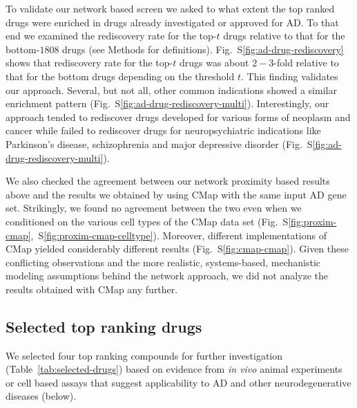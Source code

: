 \documentclass[letterpaper]{article}
\begin{document}
To validate our network based screen we asked to what extent the top ranked
drugs were enriched in drugs already investigated or approved for AD.  To that
end we examined the rediscovery rate for the top-$t$ drugs relative to that
for the bottom-$1808$ drugs (see Methods for definitions).
Fig.~S\ref{fig:ad-drug-rediscovery} shows that rediscovery rate for the
top-$t$ drugs was about $2-3$-fold relative to that for the bottom drugs
depending on the threshold $t$.  This finding validates our approach.
Several, but not all, other common indications showed a similar enrichment
pattern (Fig.~S\ref{fig:ad-drug-rediscovery-multi}).  Interestingly, our
approach tended to rediscover drugs developed for various forms of neoplasm
and cancer while failed to rediscover drugs for neuropsychiatric indications
like Parkinson's disease, schizophrenia and major depressive disorder
(Fig.~S\ref{fig:ad-drug-rediscovery-multi}).

We also checked the agreement between our network proximity based results
above and the results we obtained by using CMap with the same input AD gene
set.  Strikingly, we found no agreement between the two even when we
conditioned on the various cell types of the CMap data set
(Fig.~S\ref{fig:proxim-cmap},~S\ref{fig:proxim-cmap-celltype}).  Moreover,
different implementations of CMap yielded considerably different results
(Fig.~S\ref{fig:cmap-cmap}).  Given these conflicting observations and the
more realistic, systems-based, mechanistic modeling assumptions behind the
network approach, we did not analyze the results obtained with CMap any
further.

\subsection{Selected top ranking drugs}

We selected four top ranking compounds for further investigation
(Table~\ref{tab:selected-drugs}) based on evidence from \emph{in vivo} animal
experiments or cell based assays that suggest applicability to AD and other
neurodegenerative diseases (below).
\end{document}
